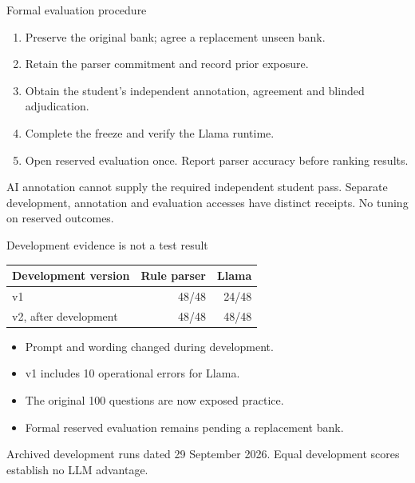 \documentclass[10pt]{beamer}
\newcommand{\toprule}{\hline}
\newcommand{\midrule}{\hline}
\newcommand{\bottomrule}{\hline}
\newcommand{\src}[1]{\vfill{\tiny\color{bcitgray}#1}}
\begin{document}
\begin{frame}{Formal evaluation procedure}
\begin{enumerate}
\item Preserve the original bank; agree a replacement unseen bank.
\item Retain the parser commitment and record prior exposure.
\item Obtain the student's independent annotation, agreement and blinded adjudication.
\item Complete the freeze and verify the Llama runtime.
\item Open reserved evaluation once. Report parser accuracy before ranking results.
\end{enumerate}
\vspace{0.2cm}
AI annotation cannot supply the required independent student pass.
\src{Separate development, annotation and evaluation accesses have distinct receipts. No tuning on reserved outcomes.}
\end{frame}

\begin{frame}{Development evidence is not a test result}
\begin{tabular}{@{}lrr@{}}
\toprule
Development version & Rule parser & Llama\\\midrule
v1 & 48/48 & 24/48\\
v2, after development & 48/48 & 48/48\\\bottomrule
\end{tabular}\par
\vspace{0.3cm}
\begin{itemize}
\item Prompt and wording changed during development.
\item v1 includes 10 operational errors for Llama.
\item The original 100 questions are now exposed practice.
\item Formal reserved evaluation remains pending a replacement bank.
\end{itemize}
\src{Archived development runs dated 29 September 2026. Equal development scores establish no LLM advantage.}
\end{frame}
\end{document}

